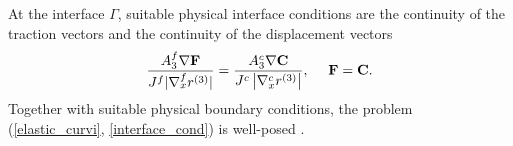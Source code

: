 At the interface $\Gamma$, suitable physical interface conditions are the continuity of the traction vectors and the continuity of the displacement vectors 
\begin{equation}\label{interface_cond}
\frac{A_3^f\nabla{\bf F}}{J^f|\nabla_x^f r^{(3)}|}  = \frac{A_3^c\nabla{\bf C}}{J^c\left|\nabla_x^c r^{(3)}\right|}, \ \ \ \ {\bf F} = {\bf C}.
\end{equation}
Together with suitable physical boundary conditions, the problem (\ref{elastic_curvi}, \ref{interface_cond}) is well-posed \cite{duru2014stable, petersson2015wave}.


